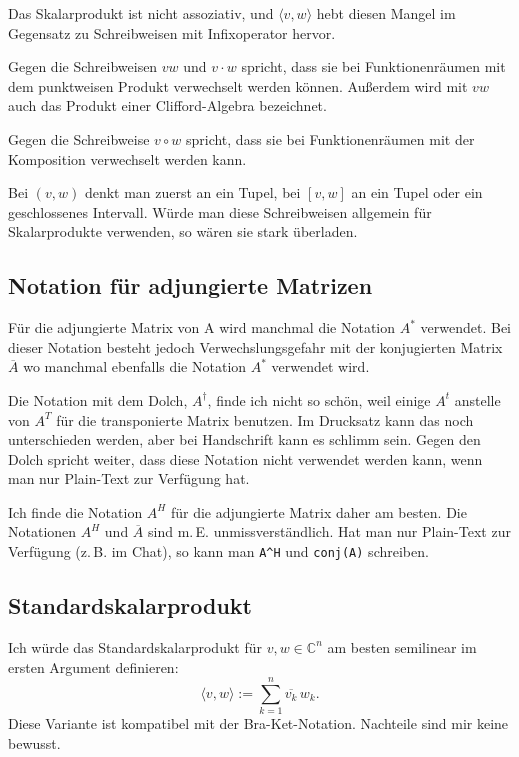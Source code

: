 \documentclass[a4paper,11pt,fleqn]{article}
\begin{document}
Das Skalarprodukt ist nicht assoziativ, und $\langle v,w\rangle$
hebt diesen Mangel im Gegensatz zu Schreibweisen mit Infixoperator
hervor.

Gegen die Schreibweisen $vw$ und $v\cdot w$ spricht, dass sie
bei Funktionenräumen mit dem punktweisen Produkt verwechselt
werden können. Außerdem wird mit $vw$ auch das Produkt einer
Clifford-Algebra bezeichnet.

Gegen die Schreibweise $v\circ w$ spricht, dass sie bei
Funktionenräumen mit der Komposition verwechselt werden kann.

Bei $(v,w)$ denkt man zuerst an ein Tupel, bei $[v,w]$
an ein Tupel oder ein geschlossenes Intervall. Würde man diese
Schreibweisen allgemein für Skalarprodukte verwenden, so wären sie
stark überladen.

\subsection{Notation für adjungierte Matrizen}
Für die adjungierte Matrix von A wird manchmal die Notation $A^*$
verwendet. Bei dieser Notation besteht jedoch Verwechslungsgefahr mit
der konjugierten Matrix $\overline{A}$ wo manchmal ebenfalls die
Notation $A^*$ verwendet wird. 

Die Notation mit dem Dolch, $A^\dagger$, finde ich nicht so schön,
weil einige $A^t$ anstelle von $A^T$ für die transponierte Matrix
benutzen. Im Drucksatz kann das noch unterschieden werden,
aber bei Handschrift kann es schlimm sein.
Gegen den Dolch spricht weiter, dass diese Notation nicht
verwendet werden kann, wenn man nur Plain-Text zur Verfügung
hat.

Ich finde die Notation $A^H$ für die adjungierte Matrix daher
am besten. Die Notationen $A^H$ und $\overline{A}$ sind m.\,E.
unmissverständlich. Hat man nur Plain-Text zur Verfügung
(z.\,B. im Chat), so kann man \verb|A^H| und \verb|conj(A)|
schreiben.

\subsection{Standardskalarprodukt}
Ich würde das Standardskalarprodukt für $v,w\in\mathbb C^n$
am besten semilinear im ersten Argument definieren:
\begin{equation}
\langle v,w\rangle := \sum_{k=1}^{n} \overline{v_k}\,w_k.
\end{equation}
Diese Variante ist kompatibel mit der Bra-Ket-Notation.
Nachteile sind mir keine bewusst.
\end{document}
